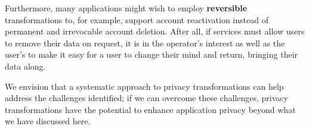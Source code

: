Furthermore, many applications might wish to employ \textbf{reversible} transformations to, for
example, support account reactivation instead of permanent and irrevocable account deletion.
%
After all, if services must allow users to remove their data on request, it is in the operator's
interest as well as the user's to make it easy for a user to change their mind and return, bringing
their data along.

We envision that a systematic approach to privacy transformations can help address the challenges
identified; if we can overcome these challenges, privacy transformations have the potential to enhance application
privacy beyond what we have discussed here.
